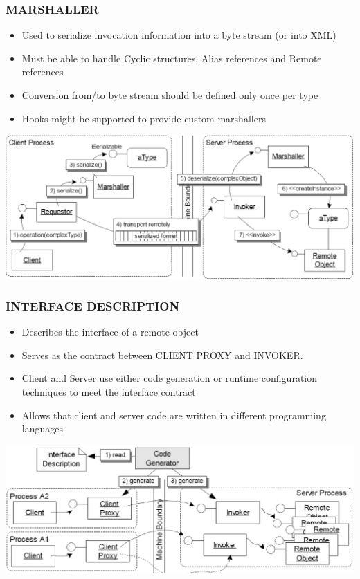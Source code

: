 \documentclass[10pt]{article}
\begin{document}
\subsubsection{MARSHALLER}
\begin{itemize}
	\item Used to serialize invocation information into a byte stream (or into XML)
	\item Must be able to handle Cyclic structures, Alias references and Remote references
	\item Conversion from/to byte stream should be defined only once per type
	\item Hooks might be supported to provide custom marshallers
\end{itemize}
\begin{center}
	\includegraphics[scale=0.2]{marshaller.png}
\end{center}
\subsubsection{INTERFACE DESCRIPTION}
\begin{itemize}
	\item Describes the interface of a remote object
	\item Serves as the contract between CLIENT PROXY and INVOKER.
	\item Client and Server use either code generation or runtime configuration techniques to meet the interface contract
	\item Allows that client and server code are written in different programming languages
\end{itemize}
\begin{center}
	\includegraphics[scale=0.2]{interface-description.png}
\end{center}
\end{document}
